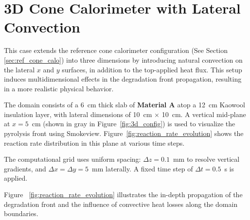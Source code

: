\documentclass[12pt]{article}
\begin{document}
\fi


\section{3D Cone Calorimeter with Lateral Convection}

This case extends the reference cone calorimeter configuration (See Section \ref{sec:ref_cone_calo}) into three dimensions by introducing natural convection on the lateral $x$ and $y$ surfaces, in addition to the top-applied heat flux. This setup induces multidimensional effects in the degradation front propagation, resulting in a more realistic physical behavior.

The domain consists of a 6~cm thick slab of \textbf{Material A} atop a 12~cm Kaowool insulation layer, with lateral dimensions of 10~cm $\times$ 10~cm. A vertical mid-plane at $x = 5$~cm (shown in gray in Figure~\ref{fig:3d_config}) is used to visualize the pyrolysis front using Smokeview. Figure~\ref{fig:reaction_rate_evolution} shows the reaction rate distribution in this plane at various time steps.

The computational grid uses uniform spacing: $\Delta z = 0.1$~mm to resolve vertical gradients, and $\Delta x = \Delta y = 5$~mm laterally. A fixed time step of $\Delta t = 0.5$~s is applied.

Figure ~\ref{fig:reaction_rate_evolution} illustrates the in-depth propagation of the degradation front and the influence of convective heat losses along the domain boundaries.

\vspace{1em}
\end{document}
